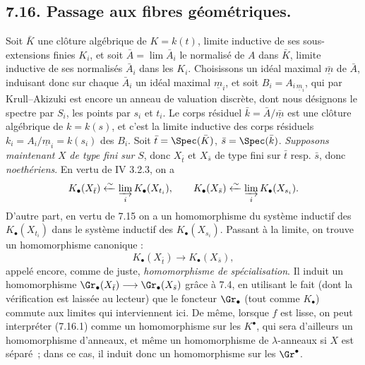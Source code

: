 
\subsection*{7.16. Passage aux fibres géométriques.}
Soit \(\bar K\) une clôture algébrique de \(K=k(t)\), limite inductive de ses sous-extensions finies \(K_i\), et soit \(\bar A=\lim \bar A_i\) le normalisé de \(A\) dans \(\bar K\), limite inductive de ses normalisés \(\bar A_i\) dans les \(K_i\). Choisissons un idéal maximal \(\bar{\underline{m}}\) de \(\bar A\), induisant donc sur chaque \(\bar A_i\) un idéal maximal \(\underline{m}_i\), et soit \(B_i=A_{i\,\underline{m}_i}\), qui par Krull--Akizuki est encore un anneau de valuation discrète, dont nous désignons le spectre par \(S_i\), les points par \(s_i\) et \(t_i\). Le corps résiduel \(\bar k=\bar A/\bar{\underline{m}}\) est une clôture algébrique de \(k=k(s)\), et c'est la limite inductive des corps résiduels \(k_i=A_i/\underline{m}_i=k(s_i)\) des \(B_i\). Soit \(\bar t=\Spec(\bar K)\), \(\bar s=\Spec(\bar k)\). \emph{Supposons maintenant} \(X\) \emph{de type fini sur} \(S\), donc \(X_{\bar t}\) et \(X_{\bar s}\) de type fini sur \(\bar t\) resp. \(\bar s\), donc \emph{noethériens}. En vertu de IV 3.2.3, on a
\[
  K_\bullet(X_{\bar t})\xleftarrow{\sim}\varinjlim_i K_\bullet(X_{t_i}),
  \qquad
  K_\bullet(X_{\bar s})\xleftarrow{\sim}\varinjlim_i K_\bullet(X_{s_i}).
\]
D'autre part, en vertu de 7.15 on a un homomorphisme du système inductif des \(K_\bullet(X_{t_i})\) dans le système inductif des \(K_\bullet(X_{s_i})\). Passant à la limite, on trouve un homomorphisme canonique :
\begin{equation}\tag{7.16.1}
  K_\bullet(X_{\bar t})\longrightarrow K_\bullet(X_{\bar s}),
\end{equation}
appelé encore, comme de juste, \emph{homomorphisme de spécialisation}. Il induit un homomorphisme \(\Gr_\bullet(X_{\bar t})\longrightarrow \Gr_\bullet(X_{\bar s})\) grâce à 7.4, en utilisant le fait (dont la vérification est laissée au lecteur) que le foncteur \(\Gr_\bullet\) (tout comme \(K_\bullet\)) commute aux limites qui interviennent ici. De même, lorsque \(f\) est lisse, on peut interpréter (7.16.1) comme un homomorphisme sur les \(K^\bullet\), qui sera d'ailleurs un homomorphisme d'anneaux, et même un homomorphisme de \(\lambda\)-anneaux si \(X\) est séparé~; dans ce cas, il induit donc un homomorphisme sur les \(\Gr^\bullet\).

